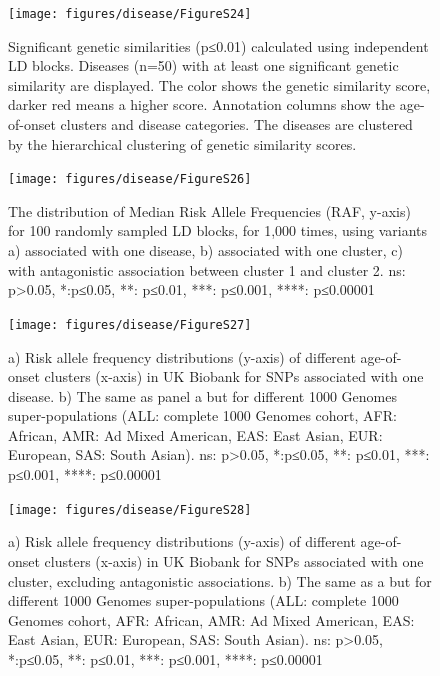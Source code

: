 \documentclass[12pt,twoside]{unicam}
\begin{document}
\begin{figure}

{\centering \texttt{[image: figures/disease/FigureS24]} 

}

\caption[Significant genetic similarities calculated using independent LD blocks.]{Significant genetic similarities (p≤0.01) calculated using independent LD blocks. Diseases (n=50) with at least one significant genetic similarity are displayed. The color shows the genetic similarity score, darker red means a higher score. Annotation columns show the age-of-onset clusters and disease categories. The diseases are clustered by the hierarchical clustering of genetic similarity scores.}\label{fig:disFigS24}
\end{figure}

\begin{figure}

{\centering \texttt{[image: figures/disease/FigureS26]} 

}

\caption[The distribution of the median risk allele frequencies for LD blocks.]{The distribution of Median Risk Allele Frequencies (RAF, y-axis) for 100 randomly sampled LD blocks, for 1,000 times, using variants a) associated with one disease, b) associated with one cluster, c) with antagonistic association between cluster 1 and cluster 2. ns: p>0.05, *:p≤0.05, **: p≤0.01, ***: p≤0.001, ****: p≤0.00001}\label{fig:disFigS26}
\end{figure}

\begin{figure}

{\centering \texttt{[image: figures/disease/FigureS27]} 

}

\caption[Risk allele frequency distributions of different age-of-onset clusters for SNPs associated with one disease.]{a) Risk allele frequency distributions (y-axis) of different age-of-onset clusters (x-axis) in UK Biobank for SNPs associated with one disease. b) The same as panel a but for different 1000 Genomes super-populations (ALL: complete 1000 Genomes cohort, AFR: African, AMR: Ad Mixed American, EAS: East Asian, EUR: European, SAS: South Asian). ns: p>0.05, *:p≤0.05, **: p≤0.01, ***: p≤0.001, ****: p≤0.00001}\label{fig:disFigS27}
\end{figure}

\begin{figure}

{\centering \texttt{[image: figures/disease/FigureS28]} 

}

\caption[Risk allele frequency distributions of different age-of-onset clusters for SNPs associated with one cluster.]{a) Risk allele frequency distributions (y-axis) of different age-of-onset clusters (x-axis) in UK Biobank for SNPs associated with one cluster, excluding antagonistic associations. b) The same as a but for different 1000 Genomes super-populations (ALL: complete 1000 Genomes cohort, AFR: African, AMR: Ad Mixed American, EAS: East Asian, EUR: European, SAS: South Asian). ns: p>0.05, *:p≤0.05, **: p≤0.01, ***: p≤0.001, ****: p≤0.00001}\label{fig:disFigS28}
\end{figure}
\end{document}
